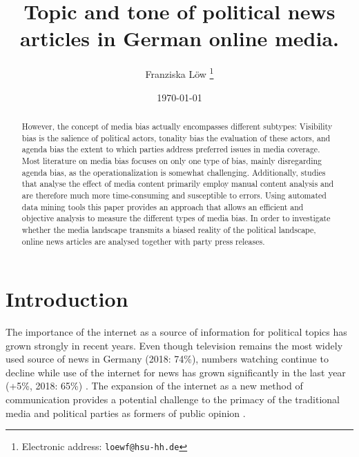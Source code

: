 \documentclass[12pt,a4paper,notitlepage]{article}
\title{Topic and tone of political news articles in German online media.}
\date{\today}
\author{Franziska Löw
  \thanks{Electronic address: \texttt{loewf@hsu-hh.de}}}
\affil{Department of Industrial Economics,\\ Helmut Schmidt University,\\ Hamburg, Germany}
\begin{document}
\begin{titlepage}
	\maketitle
	\begin{abstract}
	However, the concept of media bias actually encompasses different subtypes: Visibility bias is the salience of political actors, tonality bias the evaluation of these actors, and agenda bias the extent to which parties address preferred issues in media coverage. Most literature on media bias focuses on only one type of bias, mainly disregarding agenda bias, as the operationalization is somewhat challenging. Additionally, studies that analyse the effect of media content primarily employ manual content analysis and are therefore much more time-consuming and susceptible to errors. Using automated data mining tools this paper provides an approach that allows an efficient and objective analysis to measure the different types of media bias. In order to investigate whether the media landscape transmits a biased reality of the political landscape, online news articles are analysed together with party press releases.
	\end{abstract}

\end{titlepage}

\tableofcontents

\pagebreak


\section{Introduction}

The importance of the internet as a source of information for political topics has grown strongly in recent years. Even though television remains the most widely used source of news in Germany (2018: 74\%), numbers watching continue to decline while use of the internet for news has grown significantly in the last year (+5\%, 2018: 65\%) \citep{holig_reuters_2018}. The expansion of the internet as a new method of communication provides a potential challenge to the primacy of the traditional media and political parties as formers of public opinion \citep{savigny_public_2002}.
\end{document}
